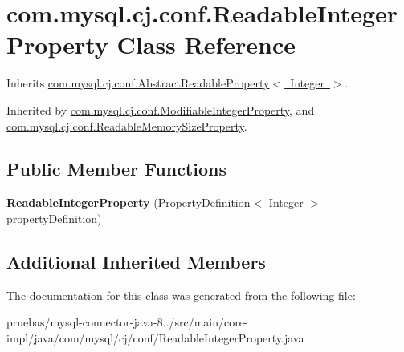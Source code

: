 \hypertarget{classcom_1_1mysql_1_1cj_1_1conf_1_1_readable_integer_property}{}\section{com.\+mysql.\+cj.\+conf.\+Readable\+Integer\+Property Class Reference}
\label{classcom_1_1mysql_1_1cj_1_1conf_1_1_readable_integer_property}


Inherits \mbox{\hyperlink{classcom_1_1mysql_1_1cj_1_1conf_1_1_abstract_readable_property}{com.\+mysql.\+cj.\+conf.\+Abstract\+Readable\+Property$<$ Integer $>$}}.



Inherited by \mbox{\hyperlink{classcom_1_1mysql_1_1cj_1_1conf_1_1_modifiable_integer_property}{com.\+mysql.\+cj.\+conf.\+Modifiable\+Integer\+Property}}, and \mbox{\hyperlink{classcom_1_1mysql_1_1cj_1_1conf_1_1_readable_memory_size_property}{com.\+mysql.\+cj.\+conf.\+Readable\+Memory\+Size\+Property}}.

\subsection*{Public Member Functions}
\begin{DoxyCompactItemize}
\item 
\mbox{\label{classcom_1_1mysql_1_1cj_1_1conf_1_1_readable_integer_property_adad2f4af839bafab79bfc05df4ac7c2e}} 
{\bfseries Readable\+Integer\+Property} (\mbox{\hyperlink{interfacecom_1_1mysql_1_1cj_1_1conf_1_1_property_definition}{Property\+Definition}}$<$ Integer $>$ property\+Definition)
\end{DoxyCompactItemize}
\subsection*{Additional Inherited Members}


The documentation for this class was generated from the following file\+:\begin{DoxyCompactItemize}
\item 
pruebas/mysql-\/connector-\/java-\/8../src/main/core-\/impl/java/com/mysql/cj/conf/Readable\+Integer\+Property.\+java\end{DoxyCompactItemize}
